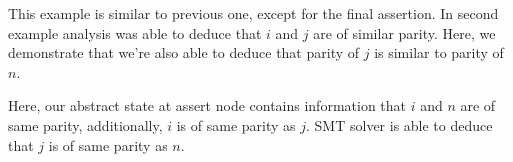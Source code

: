 This example is similar to previous one, except for the final assertion. In second example analysis was able to deduce that $i$ and $j$ are of similar parity. Here, we demonstrate that we're also able to deduce that parity of $j$ is similar to parity of $n$. 

 Here, our abstract state at assert node contains information that $i$ and $n$ are of same parity, additionally, $i$ is of same parity as $j$. SMT solver is able to deduce that $j$ is of same parity as $n$.